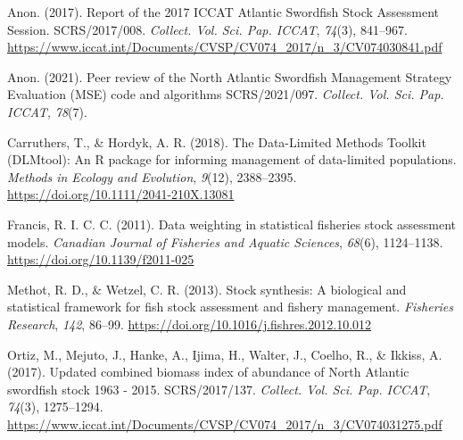 \documentclass[
]{article}
\newlength{\cslhangindent}
\newlength{\cslentryspacingunit} %
\newenvironment{CSLReferences}[2] %
 {%
  \setlength{\parindent}{0pt}
  \ifodd #1
  \let\oldpar\par
  \def\par{\hangindent=\cslhangindent\oldpar}
  \fi
  \setlength{\parskip}{#2\cslentryspacingunit}
 }%
 {}
\begin{document}
\hypertarget{refs}{}
\begin{CSLReferences}{1}{0}
\leavevmode{}%
Anon. (2017). Report of the 2017 {ICCAT Atlantic Swordfish Stock Assessment Session}. {SCRS}/2017/008. \emph{Collect. Vol. Sci. Pap. ICCAT}, \emph{74}(3), 841--967. \url{https://www.iccat.int/Documents/CVSP/CV074_2017/n_3/CV074030841.pdf}

\leavevmode{}%
Anon. (2021). Peer review of the {North Atlantic Swordfish Management Strategy Evaluation} ({MSE}) code and algorithms {SCRS}/2021/097. \emph{Collect. Vol. Sci. Pap. ICCAT,} \emph{78}(7).

\leavevmode{}%
Carruthers, T., \& Hordyk, A. R. (2018). The {Data-Limited Methods Toolkit} ({DLMtool}): {An R} package for informing management of data-limited populations. \emph{Methods in Ecology and Evolution}, \emph{9}(12), 2388--2395. \url{https://doi.org/10.1111/2041-210X.13081}

\leavevmode{}%
Francis, R. I. C. C. (2011). Data weighting in statistical fisheries stock assessment models. \emph{Canadian Journal of Fisheries and Aquatic Sciences}, \emph{68}(6), 1124--1138. \url{https://doi.org/10.1139/f2011-025}

\leavevmode{}%
Methot, R. D., \& Wetzel, C. R. (2013). Stock synthesis: {A} biological and statistical framework for fish stock assessment and fishery management. \emph{Fisheries Research}, \emph{142}, 86--99. \url{https://doi.org/10.1016/j.fishres.2012.10.012}

\leavevmode{}%
Ortiz, M., Mejuto, J., Hanke, A., Ijima, H., Walter, J., Coelho, R., \& Ikkiss, A. (2017). Updated combined biomass index of abundance of {North Atlantic} swordfish stock 1963 - 2015. {SCRS}/2017/137. \emph{Collect. Vol. Sci. Pap. ICCAT}, \emph{74}(3), 1275--1294. \url{https://www.iccat.int/Documents/CVSP/CV074_2017/n_3/CV074031275.pdf}

\end{CSLReferences}
\end{document}
